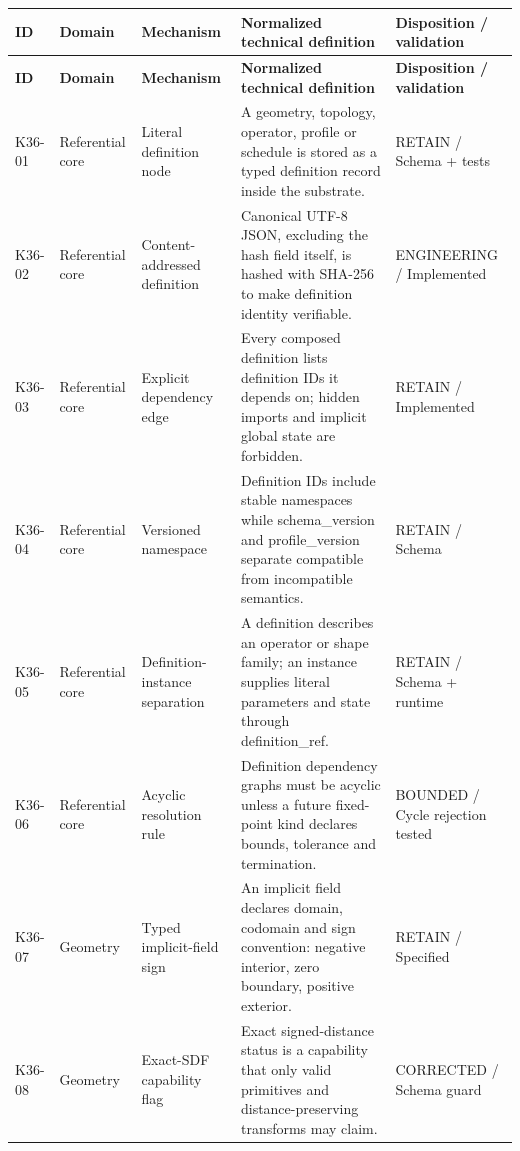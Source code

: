 \begin{longtable}{>{\raggedright\arraybackslash}p{1.0cm}>{\raggedright\arraybackslash}p{2.4cm}>{\raggedright\arraybackslash}p{3.2cm}>{\raggedright\arraybackslash}p{7.1cm}>{\raggedright\arraybackslash}p{2.3cm}}
\toprule
\textbf{ID} & \textbf{Domain} & \textbf{Mechanism} & \textbf{Normalized technical definition} & \textbf{Disposition / validation} \\
\midrule
\endfirsthead
\toprule
\textbf{ID} & \textbf{Domain} & \textbf{Mechanism} & \textbf{Normalized technical definition} & \textbf{Disposition / validation} \\
\midrule
\endhead
K36-01 & Referential core & Literal definition node & A geometry, topology, operator, profile or schedule is stored as a typed definition record inside the substrate. & RETAIN / Schema + tests \\
\addlinespace[1.5pt]
K36-02 & Referential core & Content-addressed definition & Canonical UTF-8 JSON, excluding the hash field itself, is hashed with SHA-256 to make definition identity verifiable. & ENGINEERING / Implemented \\
\addlinespace[1.5pt]
K36-03 & Referential core & Explicit dependency edge & Every composed definition lists definition IDs it depends on; hidden imports and implicit global state are forbidden. & RETAIN / Implemented \\
\addlinespace[1.5pt]
K36-04 & Referential core & Versioned namespace & Definition IDs include stable namespaces while schema\_version and profile\_version separate compatible from incompatible semantics. & RETAIN / Schema \\
\addlinespace[1.5pt]
K36-05 & Referential core & Definition-instance separation & A definition describes an operator or shape family; an instance supplies literal parameters and state through definition\_ref. & RETAIN / Schema + runtime \\
\addlinespace[1.5pt]
K36-06 & Referential core & Acyclic resolution rule & Definition dependency graphs must be acyclic unless a future fixed-point kind declares bounds, tolerance and termination. & BOUNDED / Cycle rejection tested \\
\addlinespace[1.5pt]
K36-07 & Geometry & Typed implicit-field sign & An implicit field declares domain, codomain and sign convention: negative interior, zero boundary, positive exterior. & RETAIN / Specified \\
\addlinespace[1.5pt]
K36-08 & Geometry & Exact-SDF capability flag & Exact signed-distance status is a capability that only valid primitives and distance-preserving transforms may claim. & CORRECTED / Schema guard \\

\end{longtable}
